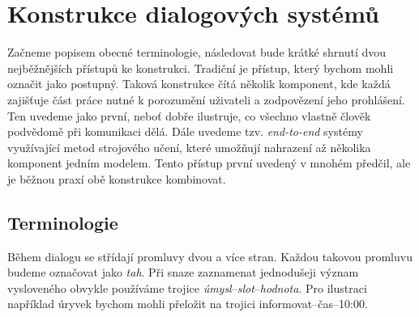 
\chapter{Konstrukce dialogových systémů}

Začneme popisem obecné terminologie, následovat bude krátké shrnutí dvou
nejběžnějších přístupů ke konstrukci. Tradiční je přístup, který bychom
mohli označit jako postupný. Taková konstrukce čítá několik komponent, kde
každá zajišťuje část práce nutné k porozumění uživateli a zodpovězení jeho
prohlášení. Ten uvedeme jako první, neboť dobře ilustruje, co všechno vlastně
člověk podvědomě při komunikaci dělá. Dále uvedeme tzv. \textit{end-to-end}
systémy využívající metod strojového učení, které umožňují nahrazení až
několika komponent jedním modelem. Tento přístup první uvedený v mnohém
předčil, ale je běžnou praxí obě konstrukce kombinovat.

\section{Terminologie}

Během dialogu se střídají promluvy dvou a více stran. Každou takovou promluvu
budeme označovat jako \textit{tah}. Při snaze zaznamenat jednodušeji význam
vysloveného obvykle používáme trojice
\textit{úmysl}--\textit{slot}--\textit{hodnota}. Pro ilustraci například
úryvek  bychom mohli přeložit na trojici
informovat--čas--10:00.